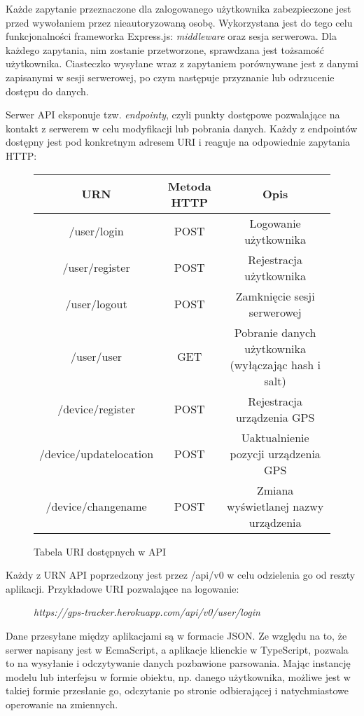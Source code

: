 \documentclass[eng,printmode]{mgr}
\begin{document}
Każde zapytanie przeznaczone dla zalogowanego użytkownika zabezpieczone jest przed wywołaniem przez nieautoryzowaną osobę. Wykorzystana jest do tego celu funkcjonalności frameworka Express.js: \textit{middleware} oraz sesja serwerowa. Dla każdego zapytania, nim zostanie przetworzone, sprawdzana jest tożsamość użytkownika. Ciasteczko wysyłane wraz z zapytaniem porównywane jest z danymi zapisanymi w sesji serwerowej, po czym następuje przyznanie lub odrzucenie dostępu do danych.


Serwer API eksponuje tzw. \textit{endpointy}, czyli punkty dostępowe pozwalające na kontakt z serwerem w celu modyfikacji lub pobrania danych. Każdy z endpointów dostępny jest pod konkretnym adresem URI i reaguje na odpowiednie zapytania HTTP: 
\begin{figure}
\centering
 \begin{tabular}{||c c c||} 
 \hline
 URN & Metoda HTTP & Opis \\ [0.5ex] 
 \hline\hline
 /user/login & POST & Logowanie użytkownika \\ 
 \hline
 /user/register & POST & Rejestracja użytkownika\\
 \hline
 /user/logout & POST & Zamknięcie sesji serwerowej\\
 \hline
 /user/user & GET & Pobranie danych użytkownika (wyłączając hash i salt)\\
 \hline
 /device/register & POST & Rejestracja urządzenia GPS  \\  
 \hline
  /device/updatelocation & POST & Uaktualnienie pozycji urządzenia GPS  \\  
 \hline
  /device/changename & POST & Zmiana wyświetlanej nazwy urządzenia \\  
 \hline
\end{tabular}
\caption{Tabela URI dostępnych w API}
\end{figure}



Każdy z URN API poprzedzony jest przez /api/v0 w celu odzielenia go od reszty aplikacji. 
Przykładowe URI pozwalające na logowanie:
\begin{figure}
\centering
\textit{https://gps-tracker.herokuapp.com/api/v0/user/login}
\end{figure}

Dane przesyłane między aplikacjami są w formacie JSON. Ze względu na to, że serwer napisany jest w EcmaScript, a aplikacje klienckie w TypeScript, pozwala to na wysyłanie i odczytywanie danych pozbawione parsowania. Mając instancję modelu lub interfejsu w formie obiektu, np. danego użytkownika, możliwe jest w takiej formie przesłanie go, odczytanie po stronie odbierającej i natychmiastowe operowanie na zmiennych.
\end{document}

